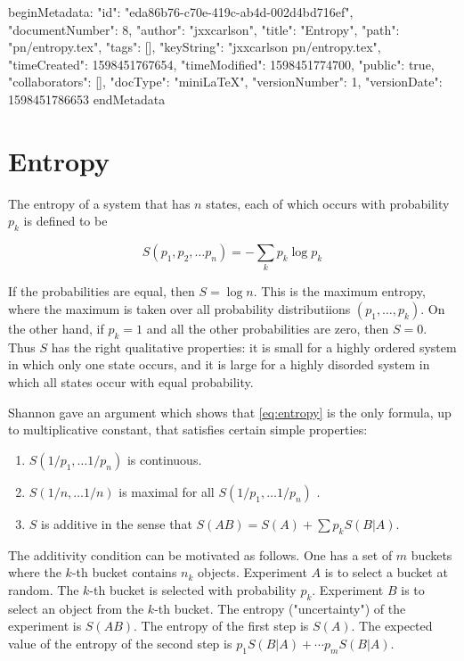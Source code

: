 beginMetadata:
{
    "id": "eda86b76-c70e-419c-ab4d-002d4bd716ef",
    "documentNumber": 8,
    "author": "jxxcarlson",
    "title": "Entropy",
    "path": "pn/entropy.tex",
    "tags": [],
    "keyString": "jxxcarlson pn/entropy.tex",
    "timeCreated": 1598451767654,
    "timeModified": 1598451774700,
    "public": true,
    "collaborators": [],
    "docType": "miniLaTeX",
    "versionNumber": 1,
    "versionDate": 1598451786653
}
endMetadata

\section{Entropy}

The entropy of a system that has $n$ states, each of which occurs with probability $p_k$ is defined to be

\begin{equation}
\label{eq:entropy}
S(p_1, p_2, \ldots p_n) = - \sum_k p_k \log p_k
\end{equation}

If the probabilities are equal, then $S = \log n$.  This is the maximum entropy, where the maximum is taken over all probability distributiions $(p_1, \ldots , p_k)$.  On the other hand, if $p_k  = 1$ and all the other probabilities are zero, then $S = 0$.  Thus $S$ has the right qualitative properties: it is small for a highly ordered system in which only one state occurs, and it is large for a highly disorded system in which all states occur with equal probability.

Shannon gave an argument which shows that \eqref{eq:entropy} is the
only formula, up to multiplicative constant, that satisfies certain simple properties:

\begin{enumerate}


\item $S(1/p_1, \ldots 1/p_n)$  is continuous.

\item $S(1/n, \ldots 1/n) $ is maximal for all $S(1/p_1, \ldots 1/p_n)$ .

\item $S$ is additive in the sense that
$S(AB) = S(A) + \sum p_kS(B|A)$.

\end{enumerate}

The additivity condition can be motivated as follows. One has a set of $m$ buckets where the $k$-th bucket contains $n_k$ objects.  Experiment $A$ is to select a bucket at random.  The $k$-th bucket is selected with probability $p_k$.  Experiment $B$ is to select an object from the $k$-th bucket. The entropy ("uncertainty") of the experiment is $S(AB)$.  The entropy of the first step is $S(A)$.  The expected value of the entropy of the second step is $p_1S(B|A) + \cdots p_mS(B|A)$.

